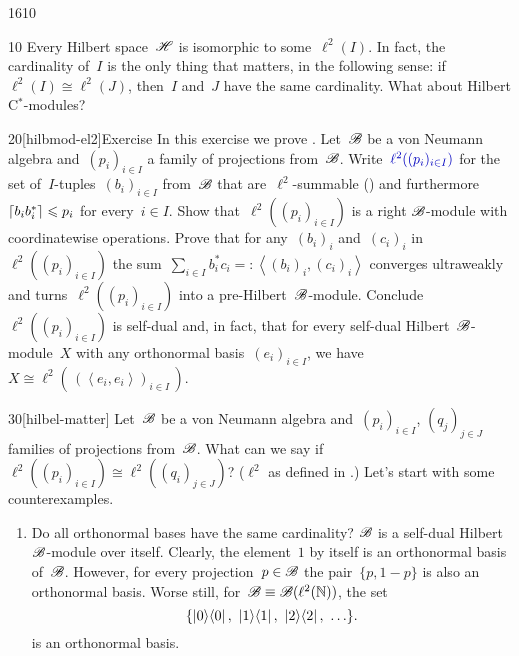 \begin{parsec}{1610}%
\begin{point}{10}%
Every Hilbert space~$\mathscr{H}$ is isomorphic to some~$\ell^2(I)$.
In fact, the cardinality of~$I$ is the only thing that matters,
    in the following sense:
    if~$\ell^2(I) \cong \ell^2(J)$, then~$I$ and~$J$
    have the same cardinality.
What about Hilbert C$^*$-modules?
\end{point}
\begin{point}{20}[hilbmod-el2]{Exercise}%
In this exercise we prove \cite[Thm.~3.12]{paschke}.
Let~$\mathscr{B}$ be a von Neumann algebra
    and~$(p_i)_{i \in I}$
    a family of projections from~$\mathscr{B}$.
    Write~$\Define{\ell^2((p_i)_{i \in I})}$
    for the set of~$I$-tuples~$(b_i)_{i \in I}$
    from~$\mathscr{B}$ that are~$\ell^2$-summable ()
    and furthermore~$\left\lceil b_ib_i^*\right\rceil \leqslant p_i$ for every~$i \in I$.
Show that~$\ell^2((p_i)_{i \in I})$
    is a right $\mathscr{B}$-module
    with coordinatewise operations.
Prove that for any~$(b_i)_i$ and~$(c_i)_i$
    in~$\ell^2((p_i)_{i \in I})$
    the sum~$\sum_{i \in I} b_i^* c_i =: \left<(b_i)_i, (c_i)_i\right>$
    converges ultraweakly
    and turns~$\ell^2((p_i)_{i\in I})$ into a pre-Hilbert~$\mathscr{B}$-module.
    Conclude~$\ell^2((p_i)_{i \in I})$ is self-dual
and, in fact, that for every self-dual Hilbert~$\mathscr{B}$-module~$X$
    with any orthonormal basis~$(e_i)_{i \in I}$,
    we have~$X \cong \ell^2(\,(\left<e_i,e_i\right>)_{i \in I}\,)$.
\end{point}

\begin{point}{30}[hilbel-matter]%
    Let~$\mathscr{B}$ be a von Neumann algebra
        and~$(p_i)_{i \in I}$, $(q_j)_{j \in J}$
        families of projections from~$\mathscr{B}$.
    What can we say if~$\ell^2((p_i)_{i \in I}) 
    \cong \ell^2((q_i)_{j \in J})$?
    ($\ell^2$ as defined in .)
    Let's start with some counterexamples.
\begin{enumerate}
\item
Do all orthonormal bases have the same cardinality?
$\mathscr{B}$ is a self-dual Hilbert~$\mathscr{B}$-module over itself.
Clearly, the element~$1$ by itself is an orthonormal basis of~$\mathscr{B}$.
However, for every projection~$p \in \mathscr{B}$
        the pair~$\{ p,1-p \}$ is also an orthonormal basis.
    Worse still, for~$\mathscr{B} \equiv \mathscr{B}(\ell^2(\mathbb{N}))$,
        the set
\begin{equation*}
    \{\ketbra{0}{0}, \ \ketbra{1}{1},\  \ketbra{2}{2},\  \ldots \}.
\end{equation*}
is an orthonormal basis.


\end{enumerate}
\end{point}
\end{parsec}
